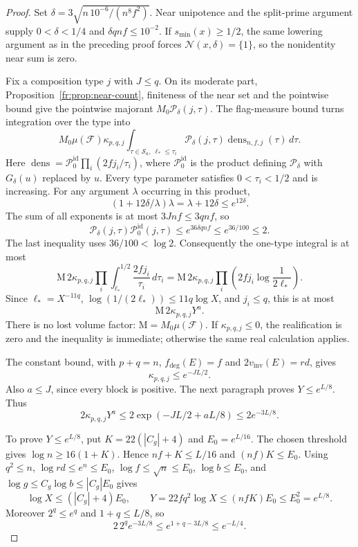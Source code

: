 \begin{proof}
Set $\delta=3\sqrt{n\,10^{-6}/(n^8f^2)}$. Near unipotence and the split-prime argument supply $0<\delta<1/4$ and $\delta qnf\le10^{-2}$. If $s_{\min}(x)\ge1/2$, the same lowering argument as in the preceding proof forces $\mathcal N(x,\delta)=\{1\}$, so the nonidentity near sum is zero.

Fix a composition type $j$ with $J\le q$. On its moderate part, Proposition~\ref{fr:prop:near-count}, finiteness of the near set and the pointwise bound give the pointwise majorant $M_0\mathcal P_\delta(j,\tau)$. The flag-measure bound turns integration over the type into
\[
 M_0\mu(\mathcal F)\kappa_{p,q,j}
 \int_{\tau\in\mathcal S_a,\ \ell_*\le\tau_i}
 \mathcal P_\delta(j,\tau)\operatorname{dens}_{n,f,j}(\tau)\,d\tau.
\]
Here $\operatorname{dens}=\mathcal P_0^{\mathrm{id}}\prod_i(2fj_i/\tau_i)$, where $\mathcal P_0^{\mathrm{id}}$ is the product defining $\mathcal P_\delta$ with $G_\delta(u)$ replaced by $u$. Every type parameter satisfies $0<\tau_i<1/2$ and is increasing. For any argument $\lambda$ occurring in this product,
\[
 (1+12\delta/\lambda)\lambda=\lambda+12\delta\le e^{12\delta}.
\]
The sum of all exponents is at most $3Jnf\le3qnf$, so
\[
 \mathcal P_\delta(j,\tau)\mathcal P_0^{\mathrm{id}}(j,\tau)
 \le e^{36\delta qnf}\le e^{36/100}\le2.
\]
The last inequality uses $36/100<\log2$. Consequently the one-type integral is at most
\[
 \mathrm M\,2\kappa_{p,q,j}\prod_i\int_{\ell_*}^{1/2}\frac{2fj_i}{\tau_i}\,d\tau_i
 =\mathrm M\,2\kappa_{p,q,j}\prod_i\left(2fj_i\log\frac1{2\ell_*}\right).
\]
Since $\ell_*=X^{-11q}$, $\log(1/(2\ell_*))\le11q\log X$, and $j_i\le q$, this is at most
\begin{equation}\label{fr:eq:one-type}
 \mathrm M\,2\kappa_{p,q,j}Y^a.
\end{equation}
There is no lost volume factor: $\mathrm M=M_0\mu(\mathcal F)$. If $\kappa_{p,q,j}\le0$, the realification is zero and the inequality is immediate; otherwise the same real calculation applies.

The constant bound, with $p+q=n$, $f_{\mathrm{deg}}(E)=f$ and $2v_{\mathrm{inv}}(E)=rd$, gives
\[
 \kappa_{p,q,j}\le e^{-JL/2}.
\]
Also $a\le J$, since every block is positive. The next paragraph proves $Y\le e^{L/8}$. Thus
\[
 2\kappa_{p,q,j}Y^a
 \le2\exp(-JL/2+aL/8)\le2e^{-3L/8}.
\]

To prove $Y\le e^{L/8}$, put $K=22(|C_g|+4)$ and $E_0=e^{L/16}$. The chosen threshold gives $\log n\ge16(1+K)$. Hence $nf+K\le L/16$ and $(nf)K\le E_0$. Using $q^2\le n$, $\log rd\le e^n\le E_0$, $\log f\le\sqrt n\le E_0$, $\log b\le E_0$, and $\log g\le C_g\log b\le|C_g|E_0$ gives
\[
 \log X\le(|C_g|+4)E_0,
 \qquad Y=22fq^2\log X\le(nfK)E_0\le E_0^2=e^{L/8}.
\]
Moreover $2^q\le e^q$ and $1+q\le L/8$, so
\begin{equation}\label{fr:eq:final-absorption}
 2\,2^q e^{-3L/8}\le e^{1+q-3L/8}\le e^{-L/4}.
\end{equation}


\end{proof}
